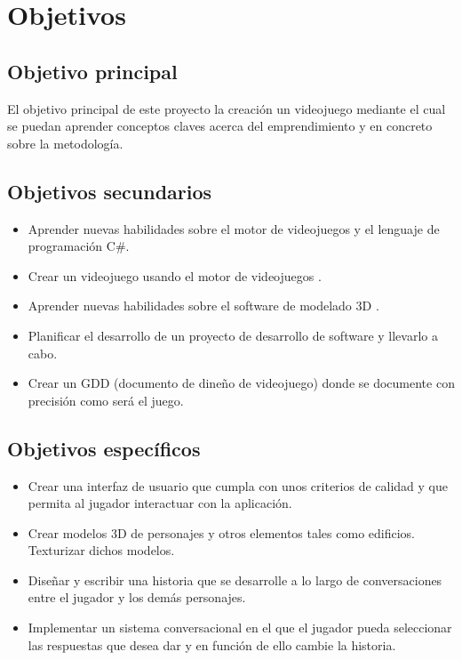 \chapter{Objetivos}

\section{Objetivo principal}

El objetivo principal de este proyecto la creación un videojuego mediante el cual se puedan aprender conceptos claves acerca del emprendimiento y en concreto sobre la metodología.

\section{Objetivos secundarios}

\begin{itemize}
	\item Aprender nuevas habilidades sobre el motor de videojuegos  y el lenguaje de programación C\#.
	\item Crear un videojuego usando el motor de videojuegos .
	\item Aprender nuevas habilidades sobre el software de modelado 3D .
	\item Planificar el desarrollo de un proyecto de desarrollo de software y llevarlo a cabo.
	\item Crear un GDD (documento de dineño de videojuego) donde se documente con precisión como será el juego.
\end{itemize}

\section{Objetivos específicos}

\begin{itemize}
	\item Crear una interfaz de usuario que cumpla con unos criterios de calidad y que permita al jugador interactuar con la aplicación.
	\item Crear modelos 3D de personajes y otros elementos tales como edificios. Texturizar dichos modelos.
	\item Diseñar y escribir una historia que se desarrolle a lo largo de conversaciones entre el jugador y los demás personajes.
	\item Implementar un sistema conversacional en el que el jugador pueda seleccionar las respuestas que desea dar y en función de ello cambie la historia.
\end{itemize}
